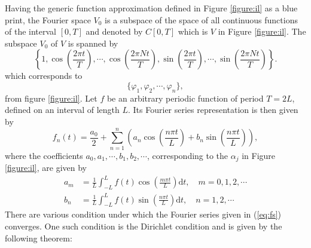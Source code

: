 \documentclass[../Main/thesis.tex]{subfiles}
\begin{document}
\justify
Having the generic function approximation defined in Figure \ref{figure:il} as a blue print, the Fourier space $V_{0}$ is a subspace of the space of all continuous functions of the interval $[0, T]$ and denoted by $C[0,T] $ which is $V$ in Figure \ref{figure:il}. The subspace $V_{0}$ of $V$ is spanned by 
\begin{equation}
\left\{1, \cos\left( \frac{2\pi t}{T} \right), \cdots,\cos\left( \frac{2\pi Nt}{T} \right), \sin\left( \frac{2\pi t}{T} \right), \cdots,\sin\left( \frac{2\pi Nt}{T} \right)   \right\}. \nonumber
\end{equation}
which corresponds to
\begin{equation}
\{\varphi_{1}, \varphi_{2}, \cdots, \varphi_{n}\}, \nonumber
\end{equation}
from figure \ref{figure:il}. Let $f$ be an arbitrary periodic function of period $T=2L$, defined on an interval of length $L$. Its Fourier series representation is then given by
\begin{equation}\label{eq:fs}
f_{n}(t) = \frac{a_{0}}{2} +\sum_{n=1}^{n}\left( a_{n} \cos\left( \frac{n\pi t}{L}\right) + b_{n} \sin\left( \frac{n\pi t}{L}\right)  \right), \end{equation}
where the coefficients $a_{0}, a_{1}, \cdots, b_{1}, b_{2},\cdots$, corresponding to the $\alpha_{j}$ in Figure \ref{figure:il}, are given by 
\begin{equation}\label{eq:fsc}
\begin{split}
a_{m} &= \frac{1}{L}\int_{-L}^{L}f(t)\cos\left( \frac{m\pi t}{L}\right) \mathrm{d}t,\quad m=0,1,2,\cdots\\
b_{n} &= \frac{1}{L}\int_{-L}^{L}f(t)\sin\left( \frac{n\pi t}{L}\right) \mathrm{d}t,\quad n=1,2,\cdots
\end{split}
\end{equation}
\justify
There are various condition under which the Fourier series given in (\ref{eq:fs}) converges. One such condition is the Dirichlet condition and is given by the following theorem:
\end{document}
